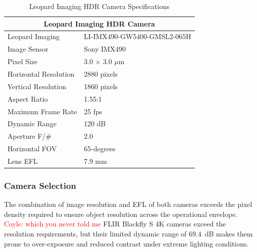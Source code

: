 \documentclass{erauthesis}
\begin{document}
\begin{table}[htpb]
\centering
\begin{tabular}{ll}
\hline
\multicolumn{2}{c}{Leopard Imaging HDR Camera}\\
\hline
\hline
Leopard Imaging & LI-IMX490-GW5400-GMSL2-065H \\
Image Sensor & Sony IMX490 \\
Pixel Size & 3.0 $\times$ 3.0 $\mu$m \\
Horizontal Resolution & 2880 pixels \\
Vertical Resolution & 1860 pixels \\
Aspect Ratio & 1.55:1 \\
Maximum Frame Rate & 25 fps \\
Dynamic Range & 120 dB \\
Aperture F/\# & $2.0$ \\
Horizontal \Ac{FOV} & 65-degrees \\ %
Lens \Ac{EFL} & 7.9 mm\\
\hline
\end{tabular}
\caption{Leopard Imaging HDR Camera Specifications}
\label{table:hdr_camera_specs}
\end{table}


\subsubsection{Camera Selection} \label{camera_selection}

The combination of image resolution and \ac{EFL} of both cameras exceeds the pixel density required to ensure object resolution across the operational envelope.
\textcolor{red}{Coyle: which you never told me}
FLIR Blackfly S 4K cameras exceed the resolution requirements, but their limited dynamic range of 69.4~dB makes them prone to over-exposure and reduced contrast under extreme lighting conditions. 
\end{document}
